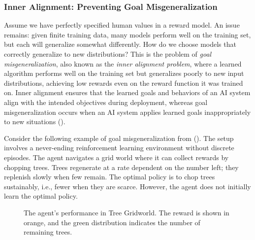 \documentclass[
  letterpaper,
  numbers=noenddot,
  DIV=11,
  oneside]{scrreprt}
\theoremstyle{remark}
\begin{document}
\subsubsection{Inner Alignment: Preventing Goal
Misgeneralization}\label{inner-alignment-preventing-goal-misgeneralization}

Assume we have perfectly specified human values in a reward model. An
issue remains: given finite training data, many models perform well on
the training set, but each will generalize somewhat differently. How do
we choose models that correctly generalize to new distributions? This is
the problem of \emph{goal misgeneralization}, also known as the
\emph{inner alignment problem}, where a learned algorithm performs well
on the training set but generalizes poorly to new input distributions,
achieving low rewards even on the reward function it was trained on.
Inner alignment ensures that the learned goals and behaviors of an AI
system align with the intended objectives during deployment, whereas
goal misgeneralization occurs when an AI system applies learned goals
inappropriately to new situations
().

Consider the following example of goal misgeneralization from
(). The setup involves a
never-ending reinforcement learning environment without discrete
episodes. The agent navigates a grid world where it can collect rewards
by chopping trees. Trees regenerate at a rate dependent on the number
left; they replenish slowly when few remain. The optimal policy is to
chop trees sustainably, i.e., fewer when they are scarce. However, the
agent does not initially learn the optimal policy.

\begin{figure}


\caption{\label{fig-enter-label-1}The agent's performance in Tree
Gridworld. The reward is shown in orange, and the green distribution
indicates the number of remaining trees.}

\end{figure}%
\end{document}
